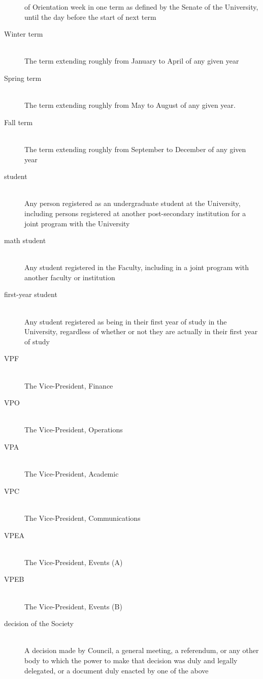 \begin{description}
  of Orientation week in one term as defined by the Senate of the University,
  until the day before the start of next term
\item[Winter term]\hfill\\
  The term extending roughly from January to April of any given year
\item[Spring term]\hfill\\
  The term extending roughly from May to August of any given year.
\item[Fall term]\hfill\\
  The term extending roughly from September to December of any given year
\item[student]\hfill\\
  Any person registered as an undergraduate student at the University, including
  persons registered at another post-secondary institution for a joint program
  with the University
\item[math student]\hfill\\
  Any student registered in the Faculty, including in a joint program with
  another faculty or institution
\item[first-year student]\hfill\\
  Any student registered as being in their first year of study in the
  University, regardless of whether or not they are actually in their first year
  of study
\item[VPF]\hfill\\
  The Vice-President, Finance
\item[VPO]\hfill\\
  The Vice-President, Operations
\item[VPA]\hfill\\
  The Vice-President, Academic
\item[VPC]\hfill\\
  The Vice-President, Communications
\item[VPEA]\hfill\\
  The Vice-President, Events (A)
\item[VPEB]\hfill\\
  The Vice-President, Events (B)
\item[decision of the Society]\hfill\\
  A decision made by Council, a general meeting, a referendum, or any other body
  to which the power to make that decision was duly and legally delegated, or a
  document duly enacted by one of the above
\end{description}

